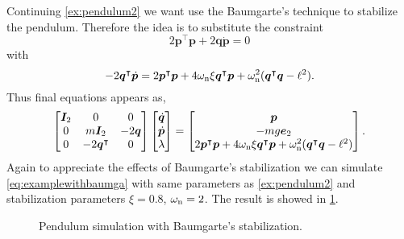 		\begin{example}
			Continuing \cref{ex:pendulum2} we want use the Baumgarte's technique to stabilize the pendulum. Therefore the idea is to substitute the constraint
			\begin{equation*}
				2\bm{p}^{\intercal}\bm{p}+2\bm{q}\dot{\bm{p}} = 0
			\end{equation*}
			with
			\begin{equation*}
				-2\bm{q}^{\intercal}\dot{\bm{p}} = 2\bm{p}^{\intercal}\bm{p} + 4\omega_{\textnormal{n}}\xi\bm{q}^{\intercal}\bm{p} + \omega_{\textnormal{n}}^{2}(\bm{q}^{\intercal}\bm{q}-\ell^{2}).
			\end{equation*}
			Thus final equations appears as, 
			\begin{equation}
				\label{eq:examplewithbaumga}
				\begin{bmatrix}
					\bm{I}_{2} 	& 0 & 0 \\
					0 			& m\bm{I}_{2} & -2\bm{q} \\ 
					0 			& -2\bm{q}^{\intercal}  & 0
				\end{bmatrix}
				\begin{bmatrix}
					\dot{\bm{q}} \\
					\dot{\bm{p}} \\
					\lambda
				\end{bmatrix}
				= 
				\begin{bmatrix}
					\bm{p} \\
					-mg\bm{e}_{2}\\
					2\bm{p}^{\intercal}\bm{p} + 4\omega_{\textnormal{n}}\xi\bm{q}^{\intercal}\bm{p} + \omega_{\textnormal{n}}^{2}(\bm{q}^{\intercal}\bm{q}-\ell^{2})
				\end{bmatrix}.
			\end{equation}
			Again to appreciate the effects of Baumgarte's stabilization we can simulate \cref{eq:examplewithbaumga} with same parameters as \cref{ex:pendulum2} and stabilization parameters $\xi = 0.8$, $\omega_{\textnormal{n}} = 2$. The result is showed in \cref{fig:trackingerros}.
			\begin{figure}[htbp]
				\centering
				\caption{Pendulum simulation with Baumgarte's stabilization.}
				\label{fig:trackingerros}
			\end{figure}
		\end{example}

